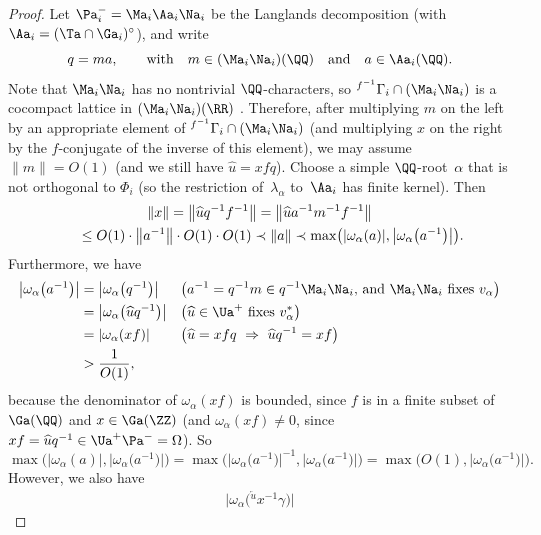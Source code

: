 \begin{proof}
Let $\Pa_i^- = \Ma_i \Aa_i \Na_i$ be the Langlands decomposition (with $\Aa_i = (\Ta \cap \Ga_i)^\circ$), and write
	\[ q = ma, \qquad \text{with} \quad m \in (\Ma_i \Na_i)(\QQ) \quad \text{and} \quad a \in \Aa_i(\QQ) .\]
Note that $\Ma_i \Na_i$ has no nontrivial $\QQ$-characters, so ${}^{f^{-1}} \Gamma_i \cap (\Ma_i \Na_i)$ is a cocompact lattice in $(\Ma_i \Na_i)(\RR)$ \cite[Theorem~4.12, p.~210]{MR1278263}. Therefore, after multiplying $m$ on the left by an appropriate element of ${}^{f^{-1}} \Gamma_i \cap (\Ma_i \Na_i)$ (and multiplying $x$ on the right by the $f$-conjugate of the inverse of this element), we may assume $\| m \| = O(1)$ (and we still have $\widehat{u} = x f q$). Choose a simple $\QQ$-root~$\alpha$ that is not orthogonal to $\Phi_i$ (so the restriction of~$\lambda_\alpha$ to~$\Aa_i$ has finite kernel). Then
	\begin{gather*}
	\|x\| = \big\| \widehat{u} q^{-1} f^{-1}\big\|
	= \big\| \widehat{u} a^{-1} m^{-1} f^{-1}\big\|\\
\hphantom{\|x\|}{} \le O(1) \cdot \big\|a^{-1}\big\| \cdot O(1) \cdot O(1)
	\prec \|a\|
	\prec \max \bigl( |\omega_\alpha(a)|, \big|\omega_\alpha\big(a^{-1}\big)\big| \bigr)
	. \end{gather*}
Furthermore, we have
	\begin{align*}
	\big|\omega_\alpha\big(a^{-1}\big)\big|
	&=\big|\omega_\alpha\big(q^{-1}\big)\big|
		&& \text{\big($a^{-1} = q^{-1} m \in q^{-1} \Ma_i \Na_i$, and $\Ma_i \Na_i$ fixes~$v_\alpha$\big)}
	\\&=\big|\omega_\alpha\big(\widehat{u} q^{-1}\big)\big|
		&& \text{\big($\widehat{u} \in \Ua^+$ fixes $v_\alpha^*$\big)}
	\\&=|\omega_\alpha(x f)|
		&& \text{\big($\widehat{u} = x f q \ \Rightarrow \ \widehat{u} q^{-1} = x f$\big)}
	\\& > \frac{1}{O(1)}	,
\end{align*}
 because the denominator of $\omega_\alpha(x f)$ is bounded, since $f$ is in a finite subset of $\Ga(\QQ)$ and $x \in \Ga(\ZZ)$ (and $\omega_\alpha(x f)\neq 0$, since $x f = \widehat{u} q^{-1} \in \Ua^+ \Pa^- = \Omega$). So
	\[ \max \bigl( |\omega_\alpha(a)|, \big|\omega_\alpha\big(a^{-1}\big)\big| \bigr)
	= \max \bigl( \big|\omega_\alpha\big(a^{-1}\big)\big|^{-1}, \big|\omega_\alpha\big(a^{-1}\big)\big| \bigr)
	= \max \bigl( O(1), \big|\omega_\alpha\big(a^{-1}\big)\big| \bigr) .\]
However, we also have
	\begin{align*}
	\big| \omega_\alpha \big( {}^{\overleftarrow{u}} \! \! x^{-1} \gamma\big) \big|

\end{align*}
\end{proof}
